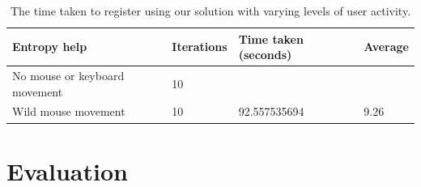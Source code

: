 \documentclass[12pt, titlepage]{article}
\begin{document}
\begin{table}[h]
	\begin{center}
    	\begin{tabular}{ | l | l | l | l |}
    \hline
     \textbf{Entropy help} & \textbf{Iterations} & \textbf{Time taken 		(seconds)} & \textbf{Average} \\ \hline
    No mouse or keyboard movement & 10 &  &  \\ \hline
    Wild mouse movement & 10 & 92.557535694 & 9.26 \\ \hline
    
    \end{tabular}
    \caption{The time taken to register using our solution with varying levels of user activity.}
    \label{tab:registerBenchmark}
   \end{center}
\end{table}


\section{Evaluation}
\end{document}
